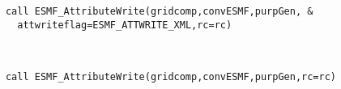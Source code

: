  \begin{verbatim}
      call ESMF_AttributeWrite(gridcomp,convESMF,purpGen, &
        attwriteflag=ESMF_ATTWRITE_XML,rc=rc)
 
\end{verbatim}
 

 \begin{verbatim}

      call ESMF_AttributeWrite(gridcomp,convESMF,purpGen,rc=rc)
 
\end{verbatim}

\setlength{\parskip}{\oldparskip}
\setlength{\parindent}{\oldparindent}
\setlength{\baselineskip}{\oldbaselineskip}
